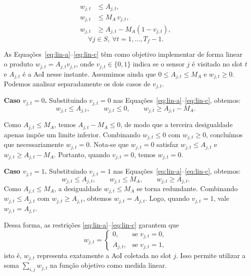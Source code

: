\documentclass[
    12pt,
    oneside,
    a4paper,
    brazil
]{abntex2}
\begin{document}
    \begin{align}
        w_{j,t} &\le A_{j,t}, \label{eq:lin-a}\\
        w_{j,t} &\le M_A\, v_{j,t}, \label{eq:lin-b}\\
        w_{j,t} &\ge A_{j,t} - M_A (1 - v_{j,t}), \label{eq:lin-c}
    \end{align}
    \[
        \forall j\in S,\ \forall t = 1,\ldots,T_f-1.
    \]
    
    As Equações~\eqref{eq:lin-a}--\eqref{eq:lin-c} têm como objetivo implementar de forma linear o produto $w_{j,t} = A_{j,t} v_{j,t}$, onde $v_{j,t} \in \{0,1\}$ indica se o sensor $j$ é visitado no slot $t$ e $A_{j,t}$ é a AoI nesse instante. Assumimos ainda que $0 \leq A_{j,t} \leq M_A$ e $w_{j,t} \geq 0$. Podemos analisar separadamente os dois casos de $v_{j,t}$.
    
    \textbf{Caso $v_{j,t} = 0$.}
    Substituindo $v_{j,t}=0$ nas Equações~\eqref{eq:lin-a}--\eqref{eq:lin-c}, obtemos:
    \[
        w_{j,t} \leq A_{j,t}, \qquad
        w_{j,t} \leq 0, \qquad
        w_{j,t} \geq A_{j,t} - M_A.
    \]
    
    Como $A_{j,t} \leq M_A$, temos $A_{j,t} - M_A \leq 0$, de modo que a terceira desigualdade apenas impõe um limite inferior. Combinando $w_{j,t} \leq 0$ com $w_{j,t} \geq 0$, concluímos que necessariamente $w_{j,t} = 0$. Nota-se que $w_{j,t} = 0$ satisfaz $w_{j,t} \leq A_{j,t}$ e $w_{j,t} \geq A_{j,t} - M_A$. Portanto, quando $v_{j,t}=0$, temos $w_{j,t}=0$.
    
    \textbf{Caso $v_{j,t} = 1$.}
    Substituindo $v_{j,t}=1$ nas Equações~\eqref{eq:lin-a}--\eqref{eq:lin-c}, obtemos:
    \[
        w_{j,t} \leq A_{j,t}, \qquad
        w_{j,t} \leq M_A, \qquad
        w_{j,t} \geq A_{j,t}.
    \]
    Como $A_{j,t} \leq M_A$, a desigualdade $w_{j,t} \leq M_A$ se torna redundante. Combinando $w_{j,t} \leq A_{j,t}$ com $w_{j,t} \geq A_{j,t}$, obtemos $w_{j,t} = A_{j,t}$. Logo, quando $v_{j,t}=1$, vale $w_{j,t}=A_{j,t}$.
    
    Dessa forma, as restrições \eqref{eq:lin-a}--\eqref{eq:lin-c} garantem que
    \[
        w_{j,t} =
        \begin{cases}
            0,        & \text{se } v_{j,t} = 0,\\[4pt]
            A_{j,t},  & \text{se } v_{j,t} = 1,
        \end{cases}
    \]
    isto é, $w_{j,t}$ representa exatamente a AoI coletada no slot $j$. Isso permite utilizar a soma $\sum_{i,j} w_{j,t}$ na função objetivo como medida linear.


    

    

    
    
\end{document}
